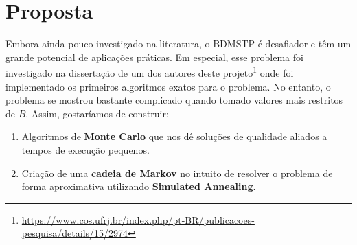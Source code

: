 \documentclass[12pt]{article}
\begin{document}
\section{Proposta}

Embora ainda pouco investigado na literatura, o BDMSTP é desafiador e têm um grande potencial de aplicações práticas. Em especial, esse problema foi investigado na dissertação de um dos autores deste projeto\footnote{\url{https://www.cos.ufrj.br/index.php/pt-BR/publicacoes-pesquisa/details/15/2974}} onde foi implementado os primeiros algoritmos exatos para o problema. No entanto, o problema se mostrou bastante complicado quando tomado valores mais restritos de $B$. Assim, gostaríamos de construir:

\begin{enumerate}
	\item Algoritmos de \textbf{Monte Carlo} que nos dê soluções de qualidade aliados a tempos de execução pequenos. 
	\item Criação de uma \textbf{cadeia de Markov} no intuito de resolver o problema de forma aproximativa utilizando \textbf{Simulated Annealing}.
\end{enumerate}


\end{document}

